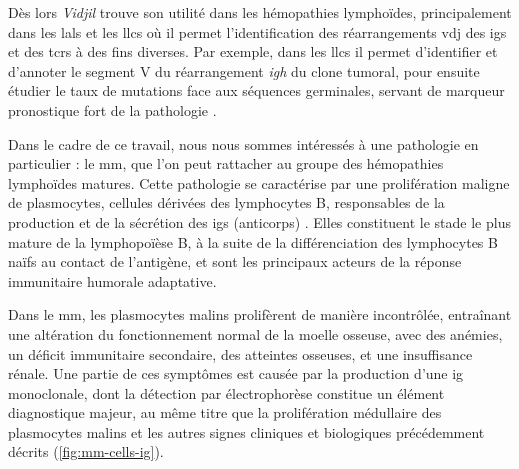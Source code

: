 


Dès lors \textit{Vidjil} trouve son utilité dans les hémopathies lymphoïdes,
principalement dans les \glspl{lal} et les \glspl{llc} où il permet
l'identification des réarrangements \gls{vdj} des \glspl{ig} et des \glspl{tcr}
à des fins diverses. Par exemple, dans les \glspl{llc} il permet d'identifier
et d'annoter le segment V du réarrangement \textit{\gls{igh}} du clone tumoral,
pour ensuite étudier le taux de mutations face aux séquences germinales,
servant de marqueur pronostique fort de la pathologie
\cite{crombieIGHVMutationalStatus2017}.

\vspace{1em}

Dans le cadre de ce travail, nous nous sommes intéressés à une pathologie en
particulier : le \gls{mm}, que l'on peut rattacher au groupe des hémopathies
lymphoïdes matures. Cette pathologie se caractérise par une prolifération
maligne de plasmocytes, cellules dérivées des lymphocytes B, responsables de la
production et de la sécrétion des \glspl{ig} (anticorps)
\cite{briglePathobiologyDiagnosisMultiple2017}. Elles constituent le stade le
plus mature de la lymphopoïèse B, à la suite de la différenciation des
lymphocytes B naïfs au contact de l'antigène, et sont les principaux acteurs de
la réponse immunitaire humorale adaptative.

\vspace{1em}


Dans le \gls{mm}, les plasmocytes malins prolifèrent de manière incontrôlée,
entraînant une altération du fonctionnement normal de la moelle osseuse, avec
des anémies, un déficit immunitaire secondaire, des atteintes osseuses, et une
insuffisance rénale. Une partie de ces symptômes est causée par la production
d'une \gls{ig} monoclonale, dont la détection par électrophorèse constitue un
élément diagnostique majeur, au même titre que la prolifération médullaire des
plasmocytes malins et les autres signes cliniques et biologiques précédemment
décrits \cite{cowanDiagnosisManagementMultiple2022a}
(\autoref{fig:mm-cells-ig}).

